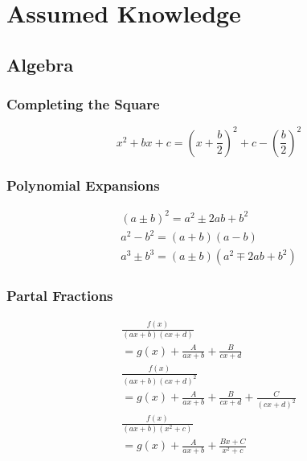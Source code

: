 \documentclass[../main]{subfiles}
\begin{document}
\section{Assumed Knowledge}

\subsection{Algebra}

	\subsubsection{Completing the Square}
	\[ x^2+bx+c = (x+\frac{b}{2})^2+c-(\frac{b}{2})^2 \]
	\subsubsection{Polynomial Expansions}
	\begin{equation*} \begin{gathered}
		(a\pm b)^2 = a^2 \pm 2ab + b^2 \\
		a^2 - b^2 = (a+b)(a-b) \\
		a^3 \pm b^3 = (a \pm b)(a^2 \mp 2ab + b^2)
	\end{gathered} \end{equation*}
	\subsubsection{Partal Fractions}
	\begin{equation*} \begin{gathered}
		\frac{f(x)}{(ax+b)(cx+d)} \\ = g(x) + \frac{A}{ax+b} + \frac{B}{cx+d} \\
		\frac{f(x)}{(ax+b)(cx+d)^2} \\ = g(x) + \frac{A}{ax+b} + \frac{B}{cx+d} + \frac{C}{(cx+d)^2} \\
		\frac{f(x)}{(ax+b)(x^2+c)} \\ = g(x) + \frac{A}{ax+b} + \frac{Bx+C}{x^2+c}
	\end{gathered} \end{equation*}
\end{document}

